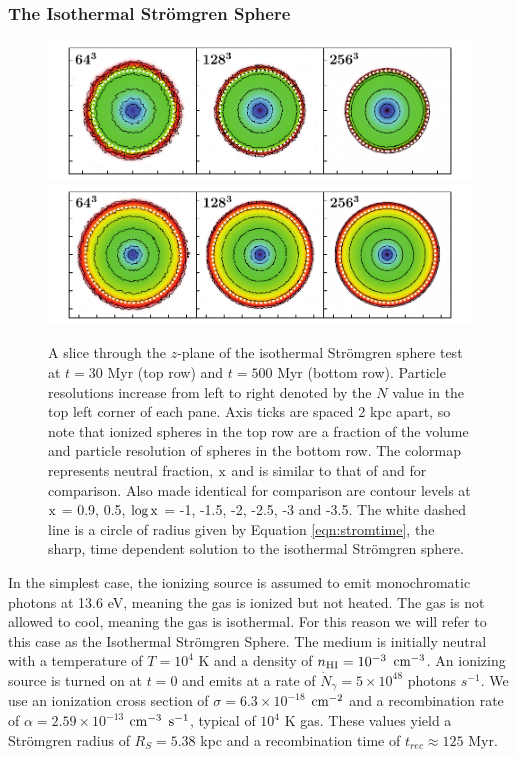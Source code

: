 \documentclass[fleq,usenatbib]{mnras}
\newcommand{\strom}{Str\"omgren}
\begin{document}
\subsubsection{The Isothermal \strom{} Sphere}
\begin{figure}
\includegraphics[width=1\linewidth]{Figures/strom_slice_iso_030.pdf}
\includegraphics[width=1\linewidth]{Figures/strom_slice_iso_500.pdf}
\caption{A slice through the $z$-plane of the isothermal \strom{} sphere
test at $t=30$ Myr (top row) and $t=500$ Myr (bottom row). Particle 
resolutions increase from left to right denoted by the $N$ value in the top 
left corner of each pane. Axis ticks are spaced 2 kpc apart, so note that 
ionized spheres in the top row are a fraction of the volume and particle 
resolution of spheres in the bottom row. The colormap represents neutral 
fraction, $\rm x$ and is similar to that of \protect\cite{pawlikSchaye08} and 
\protect\cite{pawlikSchaye11} for comparison. Also made identical for 
comparison are contour levels at $\rm x$ = 0.9, 0.5, $\log \rm x$ = -1, -1.5, 
-2, -2.5, -3 and -3.5. The white dashed line is a circle of radius given by 
Equation \ref{eqn:stromtime}, the sharp, time dependent solution to the 
isothermal \strom{} sphere.}
\label{fig:stromslice}
\end{figure}
In the simplest case, the ionizing source is assumed to emit monochromatic 
photons at 13.6 eV, meaning the gas is ionized but not heated. The gas is not 
allowed to cool, meaning the gas is isothermal. For this reason we will refer 
to this case as the Isothermal \strom{} Sphere. The medium is initially 
neutral with a temperature of $T=10^4$ K and a density of $n_{\rm HI} = 
10^{-3}$ $\rm cm^{-3}$. An ionizing source is turned on at $t=0$ and emits at 
a rate of $\dot{N}_\gamma = 5 \times 10^{48}$ photons $s^{-1}$. We use an 
ionization cross section of $\sigma = 6.3 \times 10^{-18}$ $\rm cm^{-2}$ and a 
recombination rate of $\alpha = 2.59 \times 10^{-13}$ $\rm cm^{-3}$ $\rm 
s^{-1}$, typical of $10^4$ K gas. These values yield a \strom{} radius of 
$R_S = 5.38$ kpc and a recombination time of $t_{rec} \approx  125$ Myr. 
\end{document}
